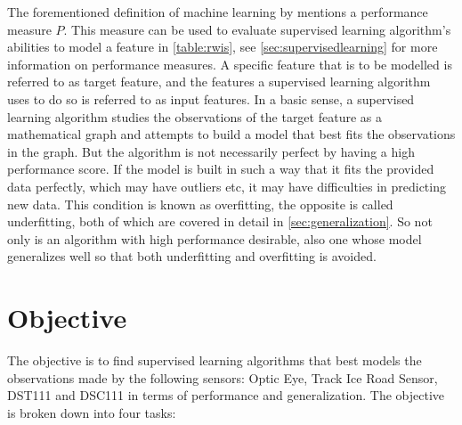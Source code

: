 	The forementioned definition of machine learning by \cite{BOOK:2} mentions a performance measure $P$. This measure can be used to evaluate supervised learning algorithm's abilities to model a feature in \ref{table:rwis}, see \ref{sec:supervisedlearning} for more information on performance measures. A specific feature that is to be modelled is referred to as target feature, and the features a supervised learning algorithm uses to do so is referred to as input features. In a basic sense, a supervised learning algorithm studies the observations of the target feature as a mathematical graph and attempts to build a model that best fits the observations in the graph. But the algorithm is not necessarily perfect by having a high performance score. If the model is built in such a way that it fits the provided data perfectly, which may have outliers etc, it may have difficulties in predicting new data. This condition is known as overfitting, the opposite is called underfitting, both of which are covered in detail in \ref{sec:generalization}. So not only is an algorithm with high performance desirable, also one whose model generalizes well so that both underfitting and overfitting is avoided.

\section{Objective}
	The objective is to find supervised learning algorithms that best models the observations made by the following sensors: Optic Eye, Track Ice Road Sensor, DST111 and DSC111 in terms of performance and generalization. The objective is broken down into four tasks:
	
